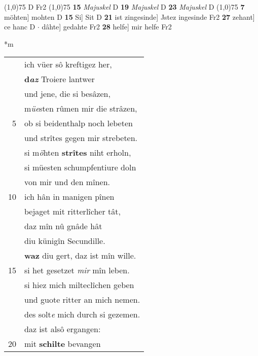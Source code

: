 \documentclass[8pt,a4paper,notitlepage]{article}
\begin{document}
\begin{table}[ht]
\begin{minipage}[t]{0.5\linewidth}
\begin{tabular}{rl}
\end{tabular}
\scriptsize
\line(1,0){75} \newline
D Fr2 \newline
\line(1,0){75} \newline
\textbf{15} \textit{Majuskel} D  \textbf{19} \textit{Majuskel} D  \textbf{23} \textit{Majuskel} D  \newline
\line(1,0){75} \newline
\textbf{7} möhten] mohten D \textbf{15} Si] Sit D \textbf{21} ist zingesinde] Jstez ingesinde Fr2 \textbf{27} zehant] ce hanc D  $\cdot$ dâhte] gedahte Fr2 \textbf{28} helfe] mir helfe Fr2 \newline
\end{minipage}
\hspace{0.5cm}
\begin{minipage}[t]{0.5\linewidth}
\small
\begin{center}*m
\end{center}
\begin{tabular}{rl}
 & ich vüer sô kreftigez her,\\ 
 & \textbf{d\textit{az}} Troiere lantwer\\ 
 & und jene, die si besâzen,\\ 
 & m\textit{üe}sten rûmen mir die strâzen,\\ 
5 & ob si beidenthalp noch lebeten\\ 
 & und strîtes gegen mir strebeten.\\ 
 & si m\textit{ö}hten \textbf{strîtes} niht erholn,\\ 
 & si müesten schumpfentiure doln\\ 
 & von mir und den mînen.\\ 
10 & ich hân in manigen pînen\\ 
 & bejaget mit ritterlîcher tât,\\ 
 & daz mîn nû gnâde hât\\ 
 & diu künigîn Secundille.\\ 
 & \textbf{waz} diu gert, daz ist mîn wille.\\ 
15 & si het gesetzet \textit{mir} mîn leben.\\ 
 & si hiez mich milteclîchen geben\\ 
 & und guote ritter an mich nemen.\\ 
 & des solt\textit{e} mich durch si gezemen.\\ 
 & daz ist alsô ergangen:\\ 
20 & mit \textbf{schilte} bevangen\\ 

\end{tabular}
\end{minipage}
\end{table}
\end{document}

